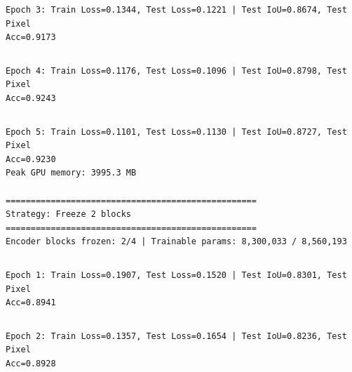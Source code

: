 \documentclass[11pt]{article}
\begin{document}
    \begin{Verbatim}[commandchars=\\\{\}]
Epoch 3: Train Loss=0.1344, Test Loss=0.1221 | Test IoU=0.8674, Test Pixel
Acc=0.9173
    \end{Verbatim}

    \begin{Verbatim}[commandchars=\\\{\}]

    \end{Verbatim}

    \begin{Verbatim}[commandchars=\\\{\}]
Epoch 4: Train Loss=0.1176, Test Loss=0.1096 | Test IoU=0.8798, Test Pixel
Acc=0.9243
    \end{Verbatim}

    \begin{Verbatim}[commandchars=\\\{\}]

    \end{Verbatim}

    \begin{Verbatim}[commandchars=\\\{\}]
Epoch 5: Train Loss=0.1101, Test Loss=0.1130 | Test IoU=0.8727, Test Pixel
Acc=0.9230
Peak GPU memory: 3995.3 MB

==================================================
Strategy: Freeze 2 blocks
==================================================
Encoder blocks frozen: 2/4 | Trainable params: 8,300,033 / 8,560,193
    \end{Verbatim}

    \begin{Verbatim}[commandchars=\\\{\}]

    \end{Verbatim}

    \begin{Verbatim}[commandchars=\\\{\}]
Epoch 1: Train Loss=0.1907, Test Loss=0.1520 | Test IoU=0.8301, Test Pixel
Acc=0.8941
    \end{Verbatim}

    \begin{Verbatim}[commandchars=\\\{\}]

    \end{Verbatim}

    \begin{Verbatim}[commandchars=\\\{\}]
Epoch 2: Train Loss=0.1357, Test Loss=0.1654 | Test IoU=0.8236, Test Pixel
Acc=0.8928
    \end{Verbatim}
\end{document}
